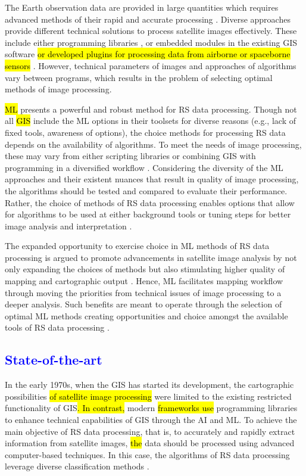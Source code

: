 \documentclass[final,5p,times,twocolumn]{elsarticle}
\numberwithin{table}{section}
\begin{document}
The Earth observation data are provided in large quantities which requires advanced methods of their rapid and accurate processing \cite{LI2023103345,YIN2021102514,HUANG20181915}. Diverse approaches provide different technical solutions to process satellite images effectively. These include either programming libraries \cite{9884758,Lemenkova202306,9297369,9553880}, or embedded\hl{ }modules in the existing GIS software \cite{Ngolo,Lemenkova202307,rs15041148} \hl{or developed plugins for processing data from airborne or spaceborne sensors} \cite{Duarte,9574057,10114939,6871809}. However, technical parameters of images and approaches of algorithms vary between programs, which results in the problem of selecting optimal methods of image processing. 

\hl{ML} presents a powerful and robust method for RS data processing. Though not all \hl{GIS} include the ML options in their toolsets for diverse reasons (e.g., lack of fixed tools, awareness of options), the choice methods for processing RS data depends on the availability of algorithms. To meet the needs of image processing, these may vary from either scripting libraries or combining GIS with programming in a diversified workflow \citep{5070195,Lemenkova202227,4736879,6049966,Lemenkova202301,6910592}. Considering the diversity of the ML approaches and their existent nuances that result in quality of image processing, the algorithms should be tested and compared to evaluate their performance. Rather, the choice of methods of RS data processing enables options that allow for algorithms to be used at either background tools or tuning steps for better image analysis and interpretation \cite{rs16010184,Lemenkova202310,rs16010127}. 

The expanded opportunity to exercise choice in ML methods of RS data processing is argued to promote advancements in satellite image analysis by not only expanding the choices of methods but also stimulating higher quality of mapping and cartographic output \cite{TSELKA2023131,Lemenkova202021,10292983}. Hence, ML facilitates mapping workflow through moving the priorities from technical issues of image processing to a deeper analysis. Such benefits are meant to operate through the selection of optimal ML methods creating opportunities and choice amongst the available tools of RS data processing \cite{WU2023110723}.

\subsection{\textcolor{blue}{State-of-the-art}}
In the early 1970s, when the GIS\hl{ }has started its development, the cartographic possibilities \hl{of satellite image processing }were limited to the existing restricted functionality of GIS\hl{. In contrast,} modern \hl{frameworks use} programming libraries to enhance technical capabilities of GIS through the AI and ML. To achieve the main objective of RS data processing, that is, to accurately and rapidly extract information from satellite images, \hl{the} data should be processed using advanced computer-based techniques. In this case, the algorithms of RS data processing leverage diverse classification methods \cite{su151813786,Lemenkova202229}. 
\end{document}
